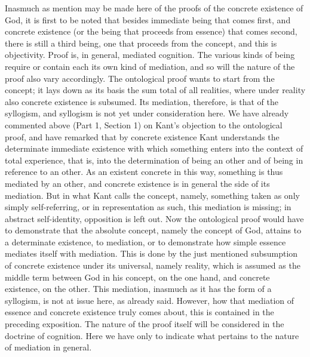 Inasmuch as mention may be made here of
the proofs of the concrete existence of God,
it is first to be noted that besides
immediate being that comes first,
and concrete existence
(or the being that proceeds from essence)
that comes second, there is still a third being,
one that proceeds from the concept,
and this is objectivity.
Proof is, in general, mediated cognition.
The various kinds of being require or contain
each its own kind of mediation,
and so will the nature of the proof also vary accordingly.
The ontological proof wants to start from the concept;
it lays down as its basis the sum total of all realities,
where under reality also concrete existence is subsumed.
Its mediation, therefore, is that of the syllogism,
and syllogism is not yet under consideration here.
We have already commented above (Part 1, Section 1)
on Kant's objection to the ontological proof,
and have remarked that by concrete existence
Kant understands the determinate immediate existence
with which something enters into the context of total experience,
that is, into the determination of being an other
and of being in reference to an other.
As an existent concrete in this way,
something is thus mediated by an other,
and concrete existence is in general the side of its mediation.
But in what Kant calls the concept, namely,
something taken as only simply self-referring,
or in representation as such, this mediation is missing;
in abstract self-identity, opposition is left out.
Now the ontological proof would have
to demonstrate that the absolute concept,
namely the concept of God,
attains to a determinate existence, to mediation,
or to demonstrate how simple essence
mediates itself with mediation.
This is done by the just mentioned
subsumption of concrete existence
under its universal, namely reality,
which is assumed as the middle term
between God in his concept, on the one hand,
and concrete existence, on the other.
This mediation, inasmuch as it has the form of a syllogism,
is not at issue here, as already said.
However, how that mediation of
essence and concrete existence truly comes about,
this is contained in the preceding exposition.
The nature of the proof itself will be considered
in the doctrine of cognition.
Here we have only to indicate what pertains
to the nature of mediation in general.

